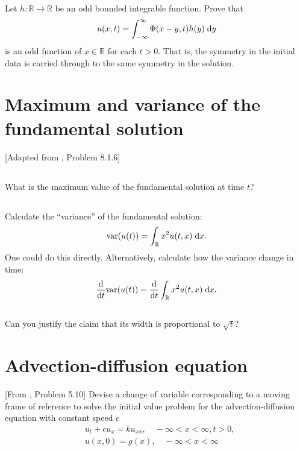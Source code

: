 \documentclass[11pt,letterpaper]{report}
\begin{document}
\subsection{}
Let $h:\mathbb{R}\to\mathbb{R}$ be an odd bounded integrable function. Prove that
\begin{align}
    u(x,t)=\int^\infty_{-\infty} \Phi(x-y,t)h(y)\;\mathrm{d} y
\end{align}
is an odd function of $x\in\mathbb{R}$ for each $t > 0$. That is, the symmetry in the initial data is carried through to the same symmetry in the solution.

\section{Maximum and variance of the fundamental solution}
[Adapted from \cite{Olver_14}, Problem 8.1.6]

\subsection{}
What is the maximum value of the fundamental solution at time $t$?

\subsection{}
Calculate the ``variance'' of the fundamental solution:
\begin{align}
    \text{var}(u(t)) = \int_\mathbb{R} x^2 u(t,x)\;\mathrm{d} x.
\end{align}
One could do this directly. Alternatively, calculate how the variance change in time:
\begin{align}
    \frac{\mathrm{d}}{\mathrm{d} t}\text{var}(u(t)) = \frac{\mathrm{d}}{\mathrm{d} t}\int_\mathbb{R} x^2 u(t,x)\;\mathrm{d} x.
\end{align}

\subsection{}
Can you justify the claim that its width is proportional to $\sqrt{t}$?

\section{Advection-diffusion equation}
[From \cite{ShearerLevy_15}, Problem 5.10] Devise a change of variable corresponding to a moving frame of reference to solve the initial value problem for the advection-diffusion equation with constant speed $c$
\begin{align}
    &u_t+cu_x = ku_{xx},\quad -\infty<x<\infty, t>0,\\
    &u(x,0) = g(x),\quad -\infty<x<\infty
\end{align}
\end{document}
